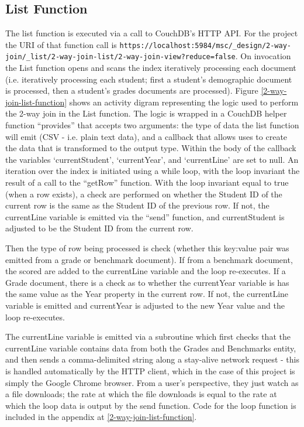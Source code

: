 

\subsection{List Function}
The list function is executed via a call to CouchDB's HTTP API. For the project the URI of that function call is \texttt{https://localhost:5984/msc/\_design/2-way-join/\_list/2-way-join-list/2-way-join-view?reduce=false}. On invocation the List function opens and scans the index iteratively processing each document (i.e. iteratively processing each student; first a student's demographic document is processed, then a student's grades documents are processed). Figure \ref{2-way-join-list-function} shows an activity digram representing the logic used to perform the 2-way join in the List function. The logic is wrapped in a CouchDB helper function ``provides'' that accepts two arguments: the type of data the list function will emit (CSV - i.e. plain text data), and a callback that allows uses to create the data that is transformed to the output type. Within the body of the callback the variables `currentStudent', `currentYear', and `currentLine' are set to null. An iteration over the index is initiated using a while loop, with the loop invariant the result of a call to the ``getRow'' function. With the loop invariant equal to true (when a row exists), a check are performed on whether the Student ID of the current row is the same as the Student ID of the previous row. If not, the currentLine variable is emitted via the ``send'' function, and currentStudent is adjusted to be the Student ID from the current row.

Then the type of row being processed is check (whether this key:value pair was emitted from a grade or benchmark document). If from a benchmark document, the scored are added to the currentLine variable and the loop re-executes. If a Grade document, there is a check as to whether the currentYear variable is has the same value as the Year property in the current row. If not, the currentLine variable is emitted and currentYear is adjusted to the new Year value and the loop re-executes.

The currentLine variable is emitted via a subroutine which first checks that the currentLine variable contains data from both the Grades and Benchmarks entity, and then sends a comma-delimited string along a stay-alive network request - this is handled automatically by the HTTP client, which in the case of this project is simply the Google Chrome browser. From a user's perspective, they just watch as a file downloads; the rate at which the file downloads is equal to the rate at which the loop data is output by the send function. Code for the loop function is included in the appendix at \ref{2-way-join-list-function}.

